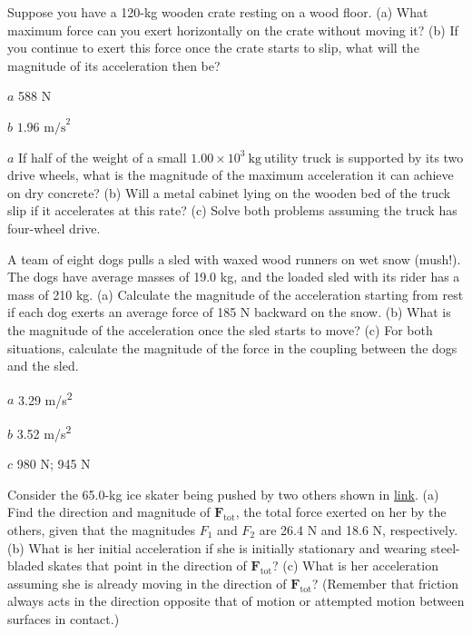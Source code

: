\documentclass[
]{book}
\begin{document}
\hypertarget{fs-id1550746}{}
\leavevmode{}%
Suppose you have a 120-kg wooden crate resting on a wood floor. (a) What
maximum force can you exert horizontally on the crate without moving it?
(b) If you continue to exert this force once the crate starts to slip,
what will the magnitude of its acceleration then be?

\leavevmode{}%
\(a\) 588 N

\(b\) \({1\text{.}\text{96\ m}\text{/s}^{2}}{}\)

\hypertarget{fs-id1294152}{}
\leavevmode{}%
\(a\) If half of the weight of a small
\({1\text{.}{\text{00} \times \text{10}^{3}}\ \text{kg}\ }{}\)utility
truck is supported by its two drive wheels, what is the magnitude of the
maximum acceleration it can achieve on dry concrete? (b) Will a metal
cabinet lying on the wooden bed of the truck slip if it accelerates at
this rate? (c) Solve both problems assuming the truck has four-wheel
drive.

\hypertarget{fs-id1294370}{}
\leavevmode{}%
A team of eight dogs pulls a sled with waxed wood runners on wet snow
(mush!). The dogs have average masses of 19.0 kg, and the loaded sled
with its rider has a mass of 210 kg. (a) Calculate the magnitude of the
acceleration starting from rest if each dog exerts an average force of
185 N backward on the snow. (b) What is the magnitude of the
acceleration once the sled starts to move? (c) For both situations,
calculate the magnitude of the force in the coupling between the dogs
and the sled.

\leavevmode{}%
\(a\) 3.29 m/s\textsuperscript{2}

\(b\) 3.52 m/s\textsuperscript{2}

\(c\) 980 N; 945 N

\hypertarget{fs-id1452889}{}
\leavevmode{}%
Consider the 65.0-kg ice skater being pushed by two others shown in
\protect\hyperlink{eip-id1992243}{link}. (a) Find the direction
and magnitude of \(\mathbf{F}_{\text{tot}}{}\), the total force exerted on
her by the others, given that the magnitudes \(F_{1}{}\) and \(F_{2}{}\) are
26.4 N and 18.6 N, respectively. (b) What is her initial acceleration if
she is initially stationary and wearing steel-bladed skates that point
in the direction of \(\mathbf{F}_{\text{tot}}{}\)? (c) What is her
acceleration assuming she is already moving in the direction of
\(\mathbf{F}_{\text{tot}}{}\)? (Remember that friction always acts in the
direction opposite that of motion or attempted motion between surfaces
in contact.)
\end{document}
